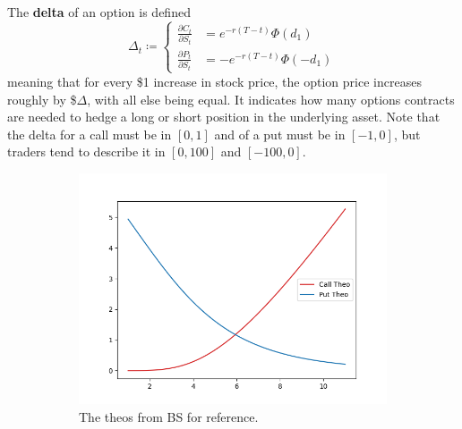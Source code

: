 \documentclass{article}
\begin{document}
    \begin{definition}[Delta]
      The \textbf{delta} of an option is defined 
      \begin{equation}
        \Delta_t \coloneqq \begin{cases} 
          \frac{\partial C_t }{\partial S_t} & = e^{-r (T - t)} \Phi(d_1) \\ 
          \frac{\partial P_t }{\partial S_t} & = -e^{-r (T - t)} \Phi(-d_1)
        \end{cases}
      \end{equation}
      meaning that for every \$1 increase in stock price, the option price increases roughly by \$$\Delta$, with all else being equal. It indicates how many options contracts are needed to hedge a long or short position in the underlying asset. Note that the delta for a call must be in $[0, 1]$ and of a put must be in $[-1, 0]$, but traders tend to describe it in $[0, 100]$ and $[-100, 0]$. 
      \begin{figure}[H]
        \centering
        \begin{subfigure}[b]{0.48\textwidth}
        \centering
          \includegraphics[width=\textwidth]{img/call_put_theo.png}
          \caption{The theos from BS for reference.}
          \label{fig:call_put_theo}
        \end{subfigure}
        \hfill 
        \begin{subfigure}[b]{0.48\textwidth}
        \centering

\end{subfigure}
\end{figure}
\end{definition}
\end{document}
